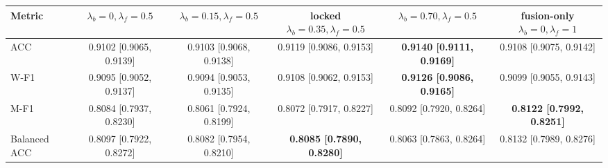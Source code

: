 \begin{tabular}{lccccc}
\toprule
Metric & $\lambda_b=0,\lambda_f=0.5$ & $\lambda_b=0.15,\lambda_f=0.5$ & locked $\lambda_b=0.35,\lambda_f=0.5$ & $\lambda_b=0.70,\lambda_f=0.5$ & fusion-only $\lambda_b=0,\lambda_f=1$ \\
\midrule
ACC & 0.9102 [0.9065, 0.9139] & 0.9103 [0.9068, 0.9138] & 0.9119 [0.9086, 0.9153] & \textbf{0.9140 [0.9111, 0.9169]} & 0.9108 [0.9075, 0.9142] \\
W-F1 & 0.9095 [0.9052, 0.9137] & 0.9094 [0.9053, 0.9135] & 0.9108 [0.9062, 0.9153] & \textbf{0.9126 [0.9086, 0.9165]} & 0.9099 [0.9055, 0.9143] \\
M-F1 & 0.8084 [0.7937, 0.8230] & 0.8061 [0.7924, 0.8199] & 0.8072 [0.7917, 0.8227] & 0.8092 [0.7920, 0.8264] & \textbf{0.8122 [0.7992, 0.8251]} \\
Balanced ACC & 0.8097 [0.7922, 0.8272] & 0.8082 [0.7954, 0.8210] & \textbf{0.8085 [0.7890, 0.8280]} & 0.8063 [0.7863, 0.8264] & 0.8132 [0.7989, 0.8276] \\
\bottomrule
\end{tabular}
